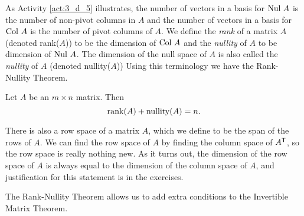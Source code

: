 As Activity \ref{act:3_d_5} illustrates, the number of vectors in a basis for $\text{Nul } A$ is the number of non-pivot columns in $A$ and the number of vectors in a basis for $\text{Col } A$ is the number of pivot columns of $A$. We define the \emph{rank} of a matrix $A$ (denoted rank($A$)) to be the dimension of $\text{Col } A$ and the \emph{nullity} of $A$ to be dimension of $\text{Nul } A$. The dimension of the null space of $A$ is also called the \emph{nullity} of $A$ (denoted nullity($A$)) Using this terminology we have the Rank-Nullity Theorem.


\begin{theorem} \label{thm:3_d_rank_nullity} Let $A$ be an $m \times n$ matrix. Then
\[\text{rank}(A) + \text{nullity}(A) = n.\]
\end{theorem}


There is also a row space of a matrix $A$, which we define to be the span of the rows of $A$. We can find the row space of $A$ by finding the column space of $A^{\mathsf{T}}$, so the row space is really nothing new. As it turns out, the dimension of the row space of $A$ is always equal to the dimension of the column space of $A$, and justification for this statement is in the exercises. 

The Rank-Nullity Theorem allows us to add extra conditions to the Invertible Matrix Theorem.

